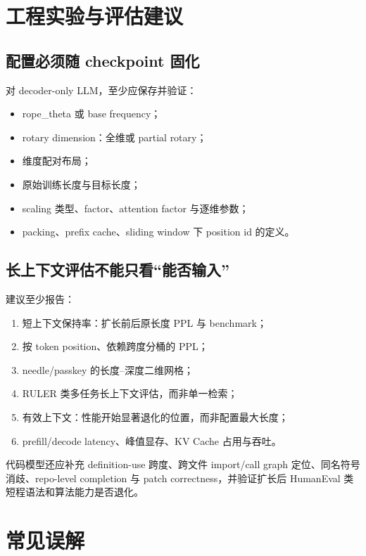 \documentclass[UTF8,fontset=none,a4paper,10pt]{ctexart}
\begin{document}
\section{工程实验与评估建议}

\subsection{配置必须随 checkpoint 固化}

对 decoder-only LLM，至少应保存并验证：
\begin{itemize}
  \item \textnormal{rope\_theta} 或 base frequency；
  \item rotary dimension：全维或 partial rotary；
  \item 维度配对布局；
  \item 原始训练长度与目标长度；
  \item scaling 类型、factor、attention factor 与逐维参数；
  \item packing、prefix cache、sliding window 下 position id 的定义。
\end{itemize}

\subsection{长上下文评估不能只看“能否输入”}

建议至少报告：
\begin{enumerate}
  \item 短上下文保持率：扩长前后原长度 PPL 与 benchmark；
  \item 按 token position、依赖跨度分桶的 PPL；
  \item needle/passkey 的长度--深度二维网格；
  \item RULER 类多任务长上下文评估，而非单一检索；
  \item 有效上下文：性能开始显著退化的位置，而非配置最大长度；
  \item prefill/decode latency、峰值显存、KV Cache 占用与吞吐。
\end{enumerate}

代码模型还应补充 definition-use 跨度、跨文件 import/call graph 定位、同名符号消歧、repo-level completion 与 patch correctness，并验证扩长后 HumanEval 类短程语法和算法能力是否退化。

\section{常见误解}
\end{document}
